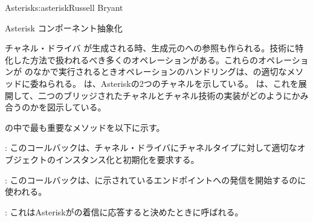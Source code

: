\begin{aosachapter}{Asterisk}{s:asterisk}{Russell Bryant}
\begin{aosasect1}{Asterisk コンポーネント抽象化}
\begin{aosasect2}{チャネル・ドライバ}
 が生成される時、生成元のへの参照も作られる。技術に特化した方法で扱われるべき多くのオペレーションがある。これらのオペレーションが のなかで実行されるときオペレーションのハンドリングは、の適切なメソッドに委ねられる。 は、Asteriskの2つのチャネルを示している。 は、これを展開して、二つのブリッジされたチャネルとチャネル技術の実装がどのようにかみ合うのかを図示している。


 の中で最も重要なメソッドを以下に示す。

\begin{aosaitemize}

\item {}: このコールバックは、チャネル・ドライバにチャネルタイプに対して適切なオブジェクトのインスタンス化と初期化を要求する。

\item {}: このコールバックは、に示されているエンドポイントへの発信を開始するのに使われる。

\item {}: これはAsteriskがの着信に応答すると決めたときに呼ばれる。


\end{aosaitemize}
\end{aosasect2}
\end{aosasect1}
\end{aosachapter}
